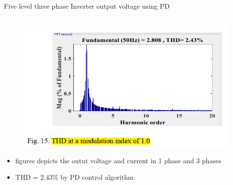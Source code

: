 \documentclass[
	11pt, %
]{beamer}
\begin{document}
\begin{frame}{Five level three phase Inverter output voltage using PD}
\begin{column}{0.5\textwidth}
		\begin{figure}
			\includegraphics[width=1\linewidth]{PD_THD.png}
		\end{figure}
		\begin{itemize}
			\scriptsize
			\item {figures depicts the outut voltage and current in 1 phase and 3 phases}
			\item {THD = 2.43\% by PD control algorithm}
		\end{itemize}
	\end{column}
\end{frame}
\end{document}
